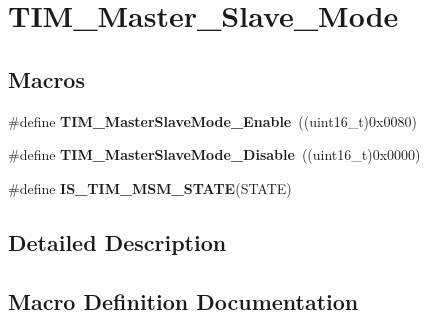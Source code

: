 \hypertarget{group___t_i_m___master___slave___mode}{}\section{T\+I\+M\+\_\+\+Master\+\_\+\+Slave\+\_\+\+Mode}
\label{group___t_i_m___master___slave___mode}
\subsection*{Macros}
\begin{DoxyCompactItemize}
\item 
\hypertarget{group___t_i_m___master___slave___mode_gaef5da910ae6952fce424b440ea39f69a}{}\#define {\bfseries T\+I\+M\+\_\+\+Master\+Slave\+Mode\+\_\+\+Enable}~((uint16\+\_\+t)0x0080)\label{group___t_i_m___master___slave___mode_gaef5da910ae6952fce424b440ea39f69a}

\item 
\hypertarget{group___t_i_m___master___slave___mode_ga8d4c7c0f57469f384b1327bb323d28a3}{}\#define {\bfseries T\+I\+M\+\_\+\+Master\+Slave\+Mode\+\_\+\+Disable}~((uint16\+\_\+t)0x0000)\label{group___t_i_m___master___slave___mode_ga8d4c7c0f57469f384b1327bb323d28a3}

\item 
\#define {\bfseries I\+S\+\_\+\+T\+I\+M\+\_\+\+M\+S\+M\+\_\+\+S\+T\+A\+T\+E}(S\+T\+A\+T\+E)
\end{DoxyCompactItemize}


\subsection{Detailed Description}


\subsection{Macro Definition Documentation}
\hypertarget{group___t_i_m___master___slave___mode_ga53146701cf287a0eca43b9232dffac60}{}
